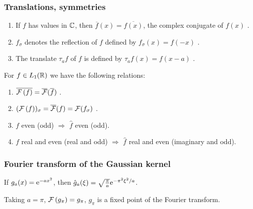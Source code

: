 \begin{frame}
\frametitle{Translations, symmetries}
\begin{enumerate}[label=(\roman*)]
\item If $f$ has values in $\mathbb{C}$, then $\overline{f}(x)=\overline{f(x)}$, the complex conjugate of $f(x)$ .
\item $f_{\sigma}$ denotes the reflection of $f$ defined by $f_{\sigma}(x)=f(-x)$ .
\item The translate $\tau_{a}f$ of $f$ is defined by $\tau_{a}f(x)=f(x-a)$ .
\end{enumerate}
\begin{theorem}
For $f\in L_1(\mathbb{R})$ we have the following relations:
\begin{enumerate}[label=(\roman*)]
\item $\overline{\mathcal{F}\left( f \right)}=\overline{\mathcal{F}}(\overline{f})$ .
\item $(\mathcal{F}\left( f \right))_{\sigma}=\overline{\mathcal{F}}(f)=\mathcal{F} (f_{\sigma})$ .
\item $f$ even (odd) $\Rightarrow$  $\hat{f}$ even (odd).
\item $f$ real and even (real and odd) $\Rightarrow$ $\hat{f}$ real  and even (imaginary and odd).
\end{enumerate}
\end{theorem}
\end{frame}

\begin{frame}
\frametitle{Fourier transform of the Gaussian kernel}
\begin{lemma}\label{lem:gaussenneTF}
If $g_a(x)= \mathrm{e}^{-a x^2}$, then $\hat{g}_a(\xi)= \sqrt{\frac{\pi}{a}}\mathrm{e}^{- \pi^2 \xi^2/a}$.
\end{lemma}
Taking $a= \pi$, $\mathcal{F}\left( g_\pi \right)= g_\pi$, $g_\pi$ is a fixed point of the Fourier transform.
\end{frame}

